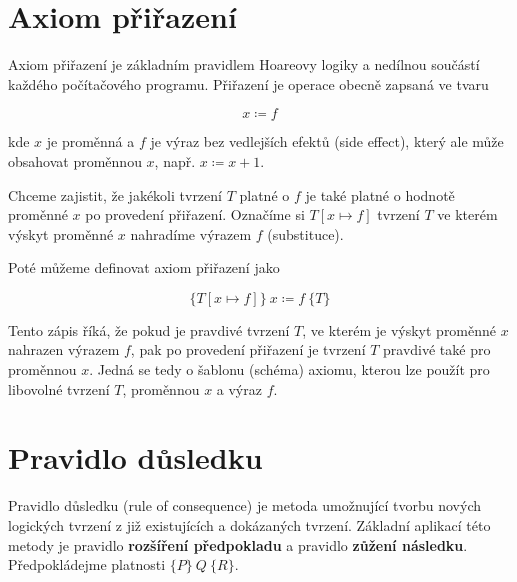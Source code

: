 \section{Axiom přiřazení}
\label{sec:hoare-axiom-prirazeni}

Axiom přiřazení je základním pravidlem Hoareovy logiky a nedílnou součástí každého počítačového programu.
Přiřazení je operace obecně zapsaná ve tvaru

\begin{equation*}
    x \coloneqq f
\end{equation*}

kde $x$ je proměnná a $f$ je výraz bez vedlejších efektů (side effect),
který ale může obsahovat proměnnou $x$, např. $x \coloneqq x + 1$.

Chceme zajistit, že jakékoli tvrzení $T$ platné o $f$
je také platné o hodnotě proměnné $x$ po provedení přiřazení.
Označíme si $T[x \mapsto f]$ tvrzení $T$ ve kterém výskyt proměnné $x$ nahradíme výrazem $f$ (substituce).

Poté můžeme definovat axiom přiřazení jako

\begin{equation*}
    \{ T[x \mapsto f] \} \  x \coloneqq f \  \{ T \}
\end{equation*}

Tento zápis říká, že pokud je pravdivé tvrzení $T$, ve kterém
je výskyt proměnné $x$ nahrazen výrazem $f$, pak po provedení přiřazení
je tvrzení $T$ pravdivé také pro proměnnou $x$.
Jedná se tedy o šablonu (schéma) axiomu,
kterou lze použít pro libovolné tvrzení $T$, proměnnou $x$ a výraz $f$.


\section{Pravidlo důsledku}
\label{sec:hoare-pravidlo-dusledku}

Pravidlo důsledku (rule of consequence) je metoda umožnující
tvorbu nových logických tvrzení z již existujících a dokázaných tvrzení.
Základní aplikací této metody je pravidlo \textbf{rozšíření předpokladu}
a pravidlo \textbf{zůžení následku}.
Předpokládejme platnosti $\{ P \} \  Q \  \{ R \}$.

